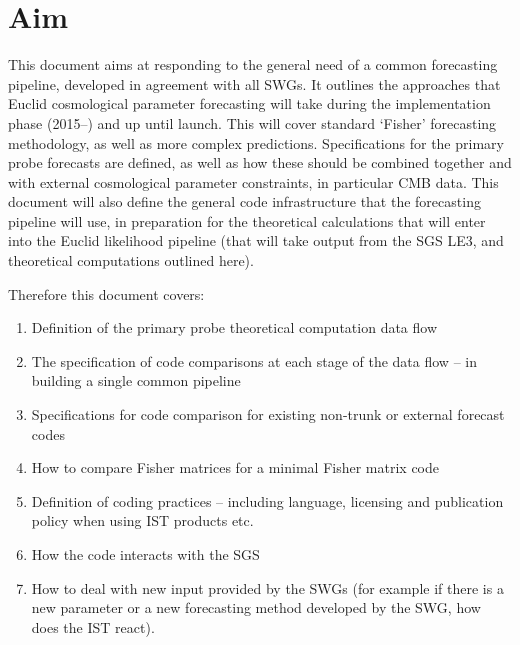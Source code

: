 



%

\section{Aim}
This document aims at responding to the general need of a common forecasting pipeline, developed in agreement with all SWGs. 
It outlines the approaches that Euclid cosmological parameter forecasting will take during the 
implementation phase (2015--) and up until launch. This will cover standard `Fisher' forecasting methodology, 
as well as more complex predictions. Specifications for the primary probe forecasts are defined, as well 
as how these should be combined together and with external cosmological parameter constraints, in particular 
CMB data. This document will also define the general code infrastructure that the forecasting pipeline will 
use, in preparation for the theoretical calculations that will enter into the Euclid likelihood pipeline 
(that will take output from the SGS LE3, and theoretical computations outlined here). 

Therefore this document covers:
\begin{enumerate}
\item Definition of the primary probe theoretical computation data flow
\item The specification of code comparisons at each stage of the data flow -- in building a single common pipeline
\item Specifications for code comparison for existing non-trunk or external forecast codes
\item How to compare Fisher matrices for a minimal Fisher matrix code 
\item Definition of coding practices -- including language, licensing and publication policy when using IST products etc. 
\item How the code interacts with the SGS 
\item How to deal with new input provided by the SWGs (for example if there is a new parameter 
  or a new forecasting method developed by the SWG, how does the IST react). 
\end{enumerate}

